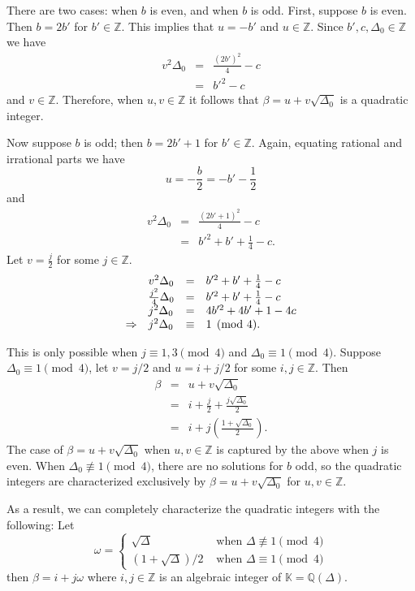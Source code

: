 \documentclass[11pt, letterpaper]{book}
\theoremstyle{definition}
\newcommand{\KK}{\mathbb{K}}
\newcommand{\ZZ}{\mathbb{Z}}
\newcommand{\QQ}{\mathbb{Q}}
\begin{document}
There are two cases: when $b$ is even, and when $b$ is odd.  First, suppose $b$ is even.  Then $b=2b'$ for $b' \in \ZZ$.  This implies that $u = -b'$ and $u \in \ZZ$.  Since $b', c, \Delta_0 \in \ZZ$ we have
\begin{eqnarray*}
	v^2 \Delta_0 & = & \frac{(2b')^2}{4} - c \\
	& = & b'^2 - c
\end{eqnarray*}
and $v \in \ZZ$.  Therefore, when $u, v \in \ZZ$ it follows that $\beta = u + v \sqrt{\Delta_0}$ is a quadratic integer.

\bigbreak
Now suppose $b$ is odd; then $b=2b' + 1$ for $b' \in \ZZ$.  Again, equating rational and irrational parts we have
\[
	u = - \frac{b}{2} = -b' - \frac{1}{2}
\]
and
\begin{eqnarray*}
	v^2 \Delta_0 & = & \frac{(2b'+1)^2}{4} - c \\
	& = & b'^2 + b' + \frac{1}{4} -c.
\end{eqnarray*}
Let $v = \frac{j}{2}$ for some $j \in \ZZ$.  
\begin{equation*}
\begin{array}{l l l l}
	& v^2 \Delta_0 & = & b'^2 + b' + \frac{1}{4} -c \\
	& \frac{j^2}{4} \Delta_0 & = & b'^2 + b' + \frac{1}{4} -c \\
	& j^2 \Delta_0 & = & 4b'^2 + 4b' + 1 - 4c \\
	\Rightarrow & j^2 \Delta_0 & \equiv & 1 \pmod 4.
\end{array}
\end{equation*}


This is only possible when $j \equiv 1,3 \pmod 4$ and $\Delta_0 \equiv 1 \pmod 4$.  Suppose $\Delta_0 \equiv 1 \pmod 4$, let $v = j/2$ and $u = i + j/2$ for some $i, j \in \ZZ$.  Then
\begin{eqnarray*}
	\beta & = & u + v \sqrt{\Delta_0} \\
	& = & i + \frac{j}{2} + \frac{j \sqrt{\Delta_0}}{2} \\
	& = & i + j \left( \frac{1 + \sqrt{\Delta_0}}{2} \right).
\end{eqnarray*}
The case of $\beta = u + v \sqrt{\Delta_0}$ when $u,v \in \ZZ$ is captured by the above when $j$ is even. When $\Delta_0 \not \equiv 1 \pmod 4$, there are no solutions for $b$ odd, so the quadratic integers are characterized exclusively by $\beta = u + v \sqrt{\Delta_0}$ for $u,v \in \ZZ$.

\bigbreak
As a result, we can completely characterize the quadratic integers with the following: Let
\[
	\omega = \begin{cases}
		\sqrt{\Delta} & \textrm{ when } \Delta \not \equiv 1 \pmod 4 \\
		(1+\sqrt{\Delta})/2 & \textrm{ when } \Delta \equiv 1 \pmod 4
	\end{cases}
\]
then $\beta = i + j \omega$ where $i,j \in \ZZ$ is an algebraic integer of $\KK = \QQ(\Delta)$.
\end{document}
